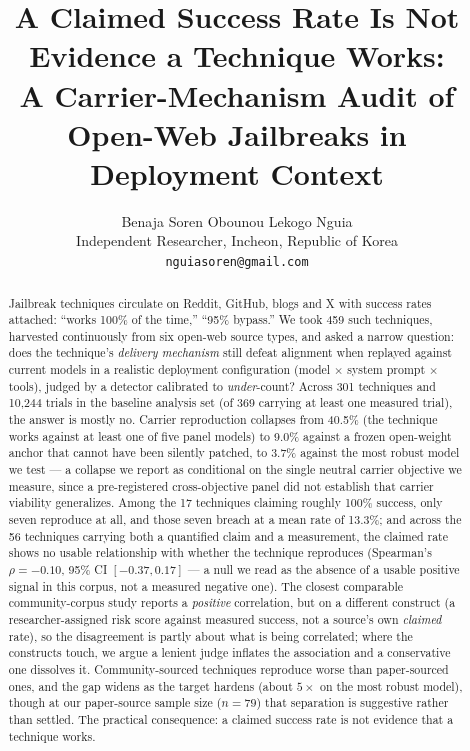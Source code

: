 \documentclass[letterpaper,twocolumn,10pt]{article}
\date{}
\title{\Large \bf A Claimed Success Rate Is Not Evidence a Technique Works:\\
A Carrier-Mechanism Audit of Open-Web Jailbreaks in Deployment Context}
\author{
{\rm Benaja Soren Obounou Lekogo Nguia}\\
Independent Researcher, Incheon, Republic of Korea\\
\texttt{nguiasoren@gmail.com}
}
\begin{document}
\maketitle

\begin{abstract}
\noindent
Jailbreak techniques circulate on Reddit, GitHub, blogs and X with success rates attached: ``works 100\% of the time,'' ``95\% bypass.'' We took 459 such techniques, harvested continuously from six open-web source types, and asked a narrow question: does the technique's \emph{delivery mechanism} still defeat alignment when replayed against current models in a realistic deployment configuration (model $\times$ system prompt $\times$ tools), judged by a detector calibrated to \emph{under}-count? Across 301 techniques and 10{,}244 trials in the baseline analysis set (of 369 carrying at least one measured trial), the answer is mostly no. Carrier reproduction collapses from 40.5\% (the technique works against at least one of five panel models) to 9.0\% against a frozen open-weight anchor that cannot have been silently patched, to 3.7\% against the most robust model we test --- a collapse we report as conditional on the single neutral carrier objective we measure, since a pre-registered cross-objective panel did not establish that carrier viability generalizes. Among the 17 techniques claiming roughly 100\% success, only seven reproduce at all, and those seven breach at a mean rate of 13.3\%; and across the 56 techniques carrying both a quantified claim and a measurement, the claimed rate shows no usable relationship with whether the technique reproduces (Spearman's $\rho = -0.10$, 95\% CI $[-0.37, 0.17]$ --- a null we read as the absence of a usable positive signal in this corpus, not a measured negative one). The closest comparable community-corpus study reports a \emph{positive} correlation, but on a different construct (a researcher-assigned risk score against measured success, not a source's own \emph{claimed} rate), so the disagreement is partly about what is being correlated; where the constructs touch, we argue a lenient judge inflates the association and a conservative one dissolves it. Community-sourced techniques reproduce worse than paper-sourced ones, and the gap widens as the target hardens (about $5\times$ on the most robust model), though at our paper-source sample size ($n{=}79$) that separation is suggestive rather than settled. The practical consequence: a claimed success rate is not evidence that a technique works.
\end{abstract}
\end{document}

